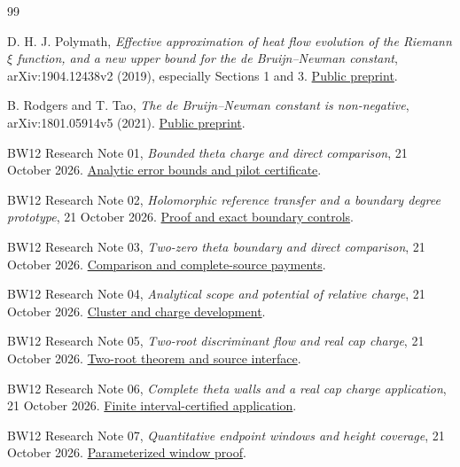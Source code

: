 \begin{thebibliography}{99}

D. H. J. Polymath,
\emph{Effective approximation of heat flow evolution of the Riemann
$\xi$ function, and a new upper bound for the de Bruijn--Newman constant},
arXiv:1904.12438v2 (2019), especially Sections 1 and 3.
\href{https://arxiv.org/abs/1904.12438v2}{Public preprint}.

B. Rodgers and T. Tao,
\emph{The de Bruijn--Newman constant is non-negative},
arXiv:1801.05914v5 (2021).
\href{https://arxiv.org/abs/1801.05914v5}{Public preprint}.

BW12 Research Note 01,
\emph{Bounded theta charge and direct comparison}, 21 October 2026.
\href{../notes/01_BOUNDED_THETA_CHARGE_AND_DIRECT_COMPARISON_20261021.md}{Analytic error bounds and pilot certificate}.

BW12 Research Note 02,
\emph{Holomorphic reference transfer and a boundary degree prototype},
21 October 2026.
\href{../notes/02_HOLOMORPHIC_REFERENCE_TRANSFER_AND_BOUNDARY_DEGREE_20261021.md}{Proof and exact boundary controls}.

BW12 Research Note 03,
\emph{Two-zero theta boundary and direct comparison}, 21 October 2026.
\href{../notes/03_TWO_ZERO_THETA_BOUNDARY_AND_DIRECT_COMPARISON_20261021.md}{Comparison and complete-source payments}.

BW12 Research Note 04,
\emph{Analytical scope and potential of relative charge}, 21 October 2026.
\href{../notes/04_ANALYTICAL_SCOPE_AND_POTENTIAL_OF_RELATIVE_CHARGE_20261021.md}{Cluster and charge development}.

BW12 Research Note 05,
\emph{Two-root discriminant flow and real cap charge}, 21 October 2026.
\href{../notes/05_TWO_ROOT_DISCRIMINANT_FLOW_AND_REAL_CAP_CHARGE_20261021.md}{Two-root theorem and source interface}.

BW12 Research Note 06,
\emph{Complete theta walls and a real cap charge application},
21 October 2026.
\href{../notes/06_COMPLETE_THETA_WALLS_AND_REAL_CAP_APPLICATION_20261021.md}{Finite interval-certified application}.

BW12 Research Note 07,
\emph{Quantitative endpoint windows and height coverage}, 21 October 2026.
\href{../notes/07_QUANTITATIVE_ENDPOINT_WINDOWS_AND_HEIGHT_COVERAGE_20261021.md}{Parameterized window proof}.


\end{thebibliography}
